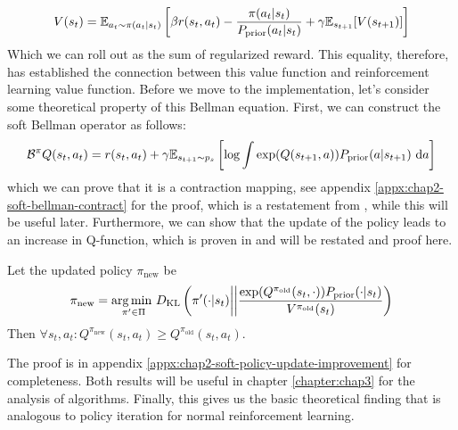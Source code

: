 \begin{equation}
    V(s_t) = \mathbb{E}_{a_t \sim \pi(a_t | s_t)} \left[\beta r(s_t, a_t) - \frac{\pi(a_t | s_t)}{P_{\text{prior}}(a_t | s_t)} + \gamma\mathbb{E}_{s_{t+1}}[V(s_{t+1})]\right]
\end{equation}
Which we can roll out as the sum of regularized reward. This equality, therefore, has established the connection between this value function and reinforcement learning value function. Before we move to the implementation, let's consider some theoretical property of this Bellman equation. First, we can construct the soft Bellman operator as follows: 
\begin{equation}
    \mathcal{B}^{\pi} Q(s_t, a_t) = r(s_t, a_t) + \gamma \mathbb{E}_{s_{t+1} \sim p_{s}}\left[ \log \int \exp(Q(s_{t+1}, a)) P_{\text{prior}}(a | s_{t+1}) \ \mathrm{d} a \right]
\end{equation}
which we can prove that it is a contraction mapping, see appendix \ref{appx:chap2-soft-bellman-contract} for the proof, which is a restatement from \cite{haarnoja2017reinforcement}, while this will be useful later. Furthermore, we can show that the update of the policy leads to an increase in Q-function, which is proven in \cite{haarnoja2018softa} and will be restated and proof here. 
\begin{theorem}
    Let the updated policy $\pi_{\text{new}}$ be 
    \begin{equation}
        \pi_{\text{new}} = \underset{\pi' \in \Pi}{\arg\min \ } D_{\mathrm{KL}}\left( \pi'(\cdot | s_t) \bigg|\bigg| \frac{\exp(Q^{\pi_{\text{old}}}(s_t, \cdot)) P_{\text{prior}}(\cdot | s_t)}{V^{\pi_{\text{old}}}(s_t)} \right)
    \end{equation}
    Then $\forall s_t, a_t : Q^{\pi_{\text{new}}}(s_t, a_t) \ge Q^{\pi_{\text{old}}}(s_t, a_t) $.
\end{theorem}
The proof is in appendix \ref{appx:chap2-soft-policy-update-improvement} for completeness. Both results will be useful in chapter \ref{chapter:chap3} for the analysis of algorithms. Finally, this gives us the basic theoretical finding that is analogous to policy iteration for normal reinforcement learning.

